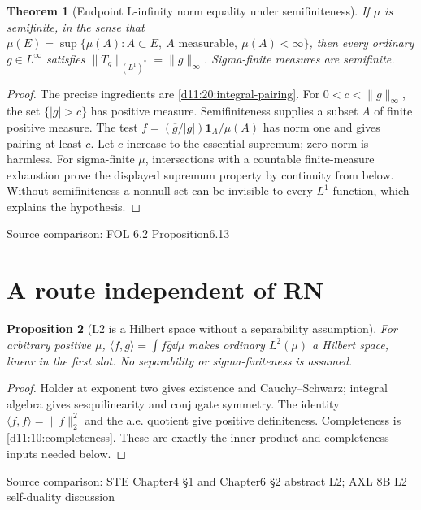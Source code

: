 \documentclass[11pt,oneside,openany]{book}
\newtheorem{theorem}{Theorem}[chapter]
\newtheorem{proposition}[theorem]{Proposition}
\theoremstyle{definition}
\theoremstyle{remark}
\newcommand{\ip}[2]{\langle#1,#2\rangle}
\newcommand{\one}{\mathbf1}\newcommand{\ind}[1]{\mathbf1_{#1}}
\newcommand{\family}[1]{}
\newcommand{\source}[1]{\par\begingroup\small\sffamily\color{black!65}Source comparison: #1\par\endgroup}
\begin{document}
\begin{theorem}[Endpoint L-infinity norm equality under semifiniteness]\family{D11.20.pairing_norm_endpoint}\label{d11:20:pairing-norm-endpoint}
If $\mu$ is semifinite, in the sense that $\mu(E)=\sup\{\mu(A):A\subset E,\ A\text{ measurable},\ \mu(A)<\infty\}$, then every ordinary $g\in L^\infty$ satisfies $\|T_g\|_{(L^1)^*}=\|g\|_\infty$. Sigma-finite measures are semifinite.
\end{theorem}
\begin{proof}
The precise ingredients are \cref{d11:20:integral-pairing}. For $0<c<\|g\|_\infty$, the set $\{|g|>c\}$ has positive measure. Semifiniteness supplies a subset $A$ of finite positive measure. The test $f=(\overline g/|g|)\one_A/\mu(A)$ has norm one and gives pairing at least $c$. Let $c$ increase to the essential supremum; zero norm is harmless. For sigma-finite $\mu$, intersections with a countable finite-measure exhaustion prove the displayed supremum property by continuity from below. Without semifiniteness a nonnull set can be invisible to every $L^1$ function, which explains the hypothesis.
\end{proof}
\source{FOL 6.2 Proposition6.13}

\section{A route independent of RN}

\begin{proposition}[L2 is a Hilbert space without a separability assumption]\family{D11.20.l2_hilbert_interface}\label{d11:20:l2-hilbert-interface}
For arbitrary positive $\mu$, $\ip f g=\int f\overline g\dd\mu$ makes ordinary $L^2(\mu)$ a Hilbert space, linear in the first slot. No separability or sigma-finiteness is assumed.
\end{proposition}
\begin{proof}
Holder at exponent two gives existence and Cauchy--Schwarz; integral algebra gives sesquilinearity and conjugate symmetry. The identity $\ip f f=\|f\|_2^2$ and the a.e. quotient give positive definiteness. Completeness is \cref{d11:10:completeness}. These are exactly the inner-product and completeness inputs needed below.
\end{proof}
\source{STE Chapter4 §1 and Chapter6 §2 abstract L2; AXL 8B L2 self-duality discussion}
\end{document}

